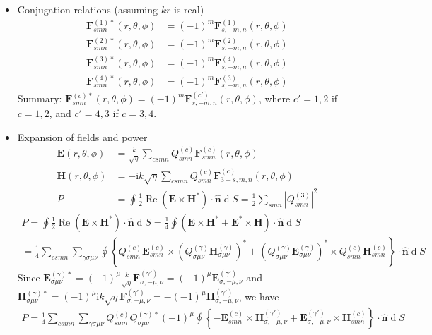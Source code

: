 \documentclass[a4paper,12pt]{article}
\renewcommand{\vec}[1]{\boldsymbol{#1}}
\newcommand{\unitvec}[1]{\hat{\vec{#1}}}
\newcommand{\mrm}[1]{\mathrm{#1}}
\newcommand{\diff}{\operatorname{d}\!}
\renewcommand{\Re}{\operatorname{Re}}
\newcommand{\iu}{\mrm{i}}
\newcommand{\Ev}{\vec{E}}
\newcommand{\Hv}{\vec{H}}
\newcommand{\Fv}{\vec{F}}
\newcommand{\nuv}{\unitvec{n}}
\begin{document}
\begin{itemize}
  $\Fv_{3mn}^{(c)}(r,\theta,\phi) \sim \nabla
  F_{mn}^{(c)}(r,\theta,\phi)$ can be defined, but is not used in
  \cite{Hansen1988}.)
\item Conjugation relations (assuming $kr$ is real)
  \begin{align}
    \Fv_{smn}^{(1)*}(r,\theta,\phi) &= (-1)^{m}\Fv_{s,-m,n}^{(1)}(r,\theta,\phi) \\
    \Fv_{smn}^{(2)*}(r,\theta,\phi) &= (-1)^{m}\Fv_{s,-m,n}^{(2)}(r,\theta,\phi) \\
    \Fv_{smn}^{(3)*}(r,\theta,\phi) &= (-1)^{m}\Fv_{s,-m,n}^{(4)}(r,\theta,\phi) \\
    \Fv_{smn}^{(4)*}(r,\theta,\phi) &= (-1)^{m}\Fv_{s,-m,n}^{(3)}(r,\theta,\phi)
  \end{align}
  Summary:
  $\Fv_{smn}^{(c)*}(r,\theta,\phi) =
  (-1)^{m}\Fv_{s,-m,n}^{(c')}(r,\theta,\phi)$, where $c'=1,2$ if
  $c=1,2$, and $c'=4,3$ if $c=3,4$.
\item Expansion of fields and power
  \begin{align}
    \Ev(r,\theta,\phi) &= \frac{k}{\sqrt{\eta}}\sum_{csmn} Q_{smn}^{(c)}\Fv_{smn}^{(c)}(r,\theta,\phi) \\
    \Hv(r,\theta,\phi) &= -\iu k\sqrt{\eta}\sum_{csmn} Q_{smn}^{(c)}\Fv_{3-s,m,n}^{(c)}(r,\theta,\phi) \\
    P &= \oint\frac{1}{2}\Re(\Ev\times\Hv^{*})\cdot\nuv\diff S = \frac{1}{2}\sum_{smn}|Q_{smn}^{(3)}|^{2}
  \end{align}
  \begin{multline}
    P = \oint\frac{1}{2}\Re(\Ev\times\Hv^{*})\cdot\nuv\diff S = \frac{1}{4} \oint (\Ev\times\Hv^{*} + \Ev^{*}\times\Hv) \cdot \nuv \diff S\\
    = \frac{1}{4}\sum_{csmn}\sum_{\gamma\sigma\mu\nu} \oint \left\{ Q_{smn}^{(c)}\Ev_{smn}^{(c)}\times(Q_{\sigma\mu\nu}^{(\gamma)}\Hv_{\sigma\mu\nu}^{(\gamma)})^{*} + (Q_{\sigma\mu\nu}^{(\gamma)}\Ev_{\sigma\mu\nu}^{(\gamma)})^{*}\times Q_{smn}^{(c)}\Hv_{smn}^{(c)} \right\} \cdot\nuv\diff S 
  \end{multline}
  Since
  $\Ev_{\sigma\mu\nu}^{(\gamma)*} =
  (-1)^{\mu}\frac{k}{\sqrt{\eta}}\Fv_{\sigma,-\mu,\nu}^{(\gamma')} =
  (-1)^{\mu}\Ev_{\sigma,-\mu,\nu}^{(\gamma')}$ and
  $\Hv_{\sigma\mu\nu}^{(\gamma)*} = (-1)^{\mu}\iu
  k\sqrt{\eta}\Fv_{\sigma,-\mu,\nu}^{(\gamma')} =
  -(-1)^{\mu}\Hv_{\sigma,-\mu,\nu}^{(\gamma')}$, we have
  \begin{multline}
    P = \frac{1}{4} \sum_{csmn}\sum_{\gamma\sigma\mu\nu} Q_{smn}^{(c)}Q_{\sigma\mu\nu}^{(\gamma)*} (-1)^{\mu} \oint \left\{ -\Ev_{smn}^{(c)}\times\Hv_{\sigma,-\mu,\nu}^{(\gamma')} + \Ev_{\sigma,-\mu,\nu}^{(\gamma')}\times\Hv_{smn}^{(c)} \right\} \cdot \nuv \diff S \\

\end{multline}
\end{itemize}
\end{document}
